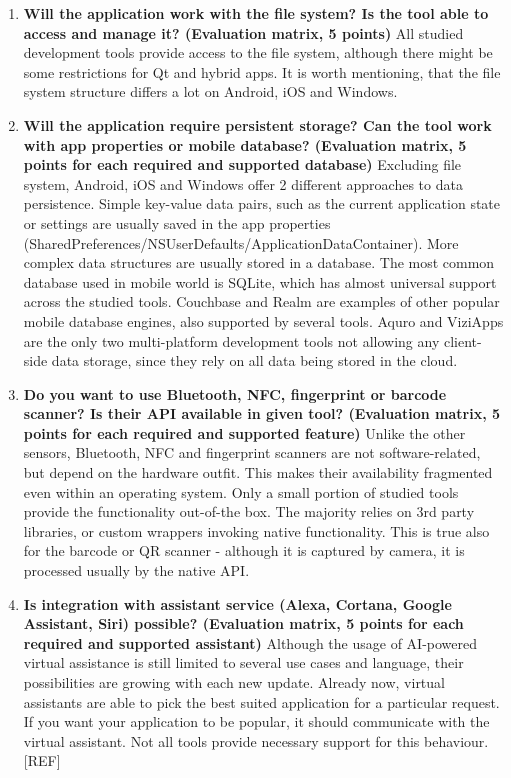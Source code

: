 \documentclass[english,master,public,dept460,male,cpdeclaration,oneside]{diploma}
\begin{document}
\begin{enumerate}
	\item \textbf{Will the application work with the file system? Is the tool able to access and manage it? (Evaluation matrix, 5 points) }
	All studied development tools provide access to the file system, although there might be some restrictions for Qt and hybrid apps. It is worth mentioning, that the file system structure differs a lot on Android, iOS and Windows. 
	
	\item \textbf{Will the application require persistent storage? Can the tool work with app properties or mobile database? (Evaluation matrix, 5 points for each required and supported database) }
	Excluding file system, Android, iOS and Windows offer 2 different approaches to data persistence. Simple key-value data pairs, such as the current application state or settings are usually saved in the app properties (SharedPreferences/NSUserDefaults/ApplicationDataContainer). More complex data structures are usually stored in a database. The most common database used in mobile world is SQLite, which has almost universal support across the studied tools. Couchbase and Realm are examples of other popular mobile database engines, also supported by several tools. Aquro and ViziApps are the only two multi-platform development tools not allowing any client-side data storage, since they rely on all data being stored in the cloud.
	
	\item \textbf{Do you want to use Bluetooth, NFC, fingerprint or barcode scanner? Is their API available in given tool? (Evaluation matrix, 5 points for each required and supported feature) }
	Unlike the other sensors, Bluetooth, NFC and fingerprint scanners are not software-related, but depend on the hardware outfit. This makes their availability fragmented even within an operating system. Only a small portion of studied tools provide the functionality out-of-the box. The majority relies on 3rd party libraries, or custom wrappers invoking native functionality. This is true also for the barcode or QR scanner - although it is captured by camera, it is processed usually by the native API.
	
	\item \textbf{Is integration with assistant service (Alexa, Cortana, Google Assistant, Siri) possible? (Evaluation matrix, 5 points for each required and supported assistant)} 
	Although the usage of AI-powered virtual assistance is still limited to several use cases and language, their possibilities are growing with each new update. Already now, virtual assistants are able to pick the best suited application for a particular request. If you want your application to be popular, it should communicate with the virtual assistant. Not all tools provide necessary support for this behaviour. [REF]
	

\end{enumerate}
\end{document}
